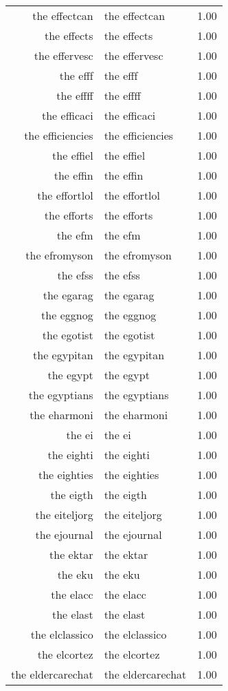 \begin{table}[ht]
\begin{tabular}{rlr}
  the effectcan & the effectcan & 1.00 \\ 
  the effects & the effects & 1.00 \\ 
  the effervesc & the effervesc & 1.00 \\ 
  the efff & the efff & 1.00 \\ 
  the effff & the effff & 1.00 \\ 
  the efficaci & the efficaci & 1.00 \\ 
  the efficiencies & the efficiencies & 1.00 \\ 
  the effiel & the effiel & 1.00 \\ 
  the effin & the effin & 1.00 \\ 
  the effortlol & the effortlol & 1.00 \\ 
  the efforts & the efforts & 1.00 \\ 
  the efm & the efm & 1.00 \\ 
  the efromyson & the efromyson & 1.00 \\ 
  the efss & the efss & 1.00 \\ 
  the egarag & the egarag & 1.00 \\ 
  the eggnog & the eggnog & 1.00 \\ 
  the egotist & the egotist & 1.00 \\ 
  the egypitan & the egypitan & 1.00 \\ 
  the egypt & the egypt & 1.00 \\ 
  the egyptians & the egyptians & 1.00 \\ 
  the eharmoni & the eharmoni & 1.00 \\ 
  the ei & the ei & 1.00 \\ 
  the eighti & the eighti & 1.00 \\ 
  the eighties & the eighties & 1.00 \\ 
  the eigth & the eigth & 1.00 \\ 
  the eiteljorg & the eiteljorg & 1.00 \\ 
  the ejournal & the ejournal & 1.00 \\ 
  the ektar & the ektar & 1.00 \\ 
  the eku & the eku & 1.00 \\ 
  the elacc & the elacc & 1.00 \\ 
  the elast & the elast & 1.00 \\ 
  the elclassico & the elclassico & 1.00 \\ 
  the elcortez & the elcortez & 1.00 \\ 
  the eldercarechat & the eldercarechat & 1.00 \\ 

\end{tabular}
\end{table}
